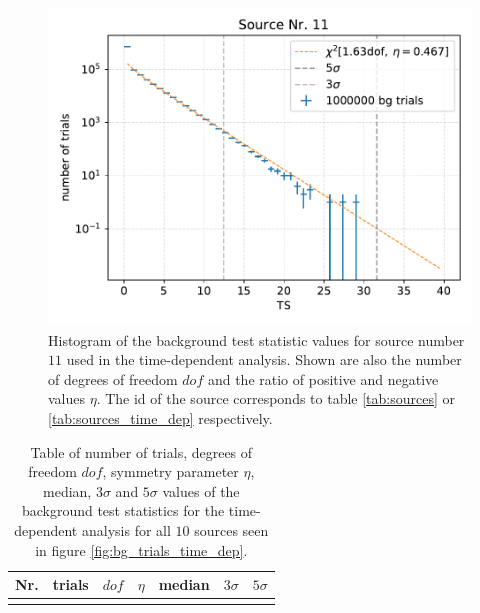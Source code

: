 \begin{figure}
    \centering
    \includegraphics[width=\linewidth]{Plots/05_csky/9_years_gfu_gold_time_dep_bg_t0_1.pdf}
    \caption{Histogram of the background test statistic values for source number $\num{11}$ used in the time-dependent analysis. Shown are also the number of degrees of freedom $dof$ and the ratio of positive and negative values $\eta$. The id of the source corresponds to table \ref{tab:sources} or \ref{tab:sources_time_dep} respectively.}
    \label{fig:bg_trials_time_dep_1}
\end{figure}
\begin{table}
  \centering
  \caption[]{Table of number of trials, degrees of freedom $dof$, symmetry parameter $\eta$, median\footnotemark, $\num{3}\sigma$ and $\num{5}\sigma$ values of the background test statistics for the time-dependent analysis for all $\num{10}$ sources seen in figure \ref{fig:bg_trials_time_dep}.}
  \begin{tabular}{crccccc}
    \toprule
    Nr. & trials & $dof$ & $\eta$ & median & $\num{3}\sigma$ & $\num{5}\sigma$ \\
    \toprule
      
    \toprule
    \label{tab:sigma_time_dep}
  \end{tabular}
\end{table}
